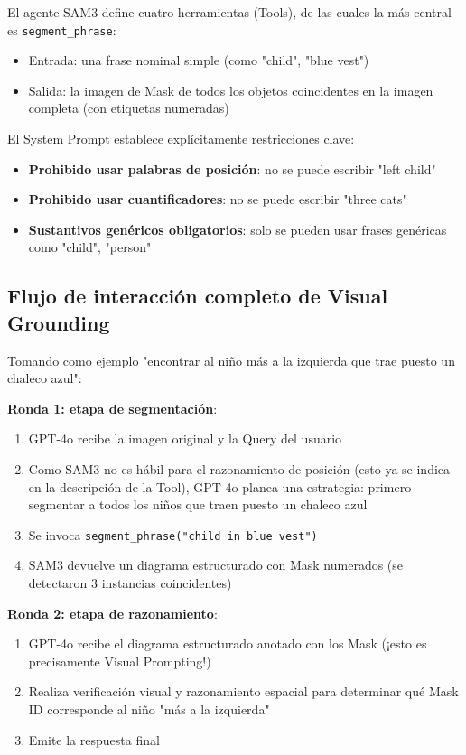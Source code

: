 \documentclass[a4paper]{article}
\begin{document}
El agente SAM3 define cuatro herramientas (Tools), de las cuales la más central es \texttt{segment\_phrase}:

\begin{itemize}
    \item Entrada: una frase nominal simple (como "child", "blue vest")
    \item Salida: la imagen de Mask de todos los objetos coincidentes en la imagen completa (con etiquetas numeradas)
\end{itemize}

El System Prompt establece explícitamente restricciones clave:
\begin{itemize}
    \item \textbf{Prohibido usar palabras de posición}: no se puede escribir "left child"
    \item \textbf{Prohibido usar cuantificadores}: no se puede escribir "three cats"
    \item \textbf{Sustantivos genéricos obligatorios}: solo se pueden usar frases genéricas como "child", "person"
\end{itemize}

\subsection{Flujo de interacción completo de Visual Grounding}

Tomando como ejemplo "encontrar al niño más a la izquierda que trae puesto un chaleco azul":

\textbf{Ronda 1: etapa de segmentación}:
\begin{enumerate}
    \item GPT-4o recibe la imagen original y la Query del usuario
    \item Como SAM3 no es hábil para el razonamiento de posición (esto ya se indica en la descripción de la Tool), GPT-4o planea una estrategia: primero segmentar a todos los niños que traen puesto un chaleco azul
    \item Se invoca \texttt{segment\_phrase("child in blue vest")}
    \item SAM3 devuelve un diagrama estructurado con Mask numerados (se detectaron 3 instancias coincidentes)
\end{enumerate}

\textbf{Ronda 2: etapa de razonamiento}:
\begin{enumerate}
    \item GPT-4o recibe el diagrama estructurado anotado con los Mask (¡esto es precisamente Visual Prompting!)
    \item Realiza verificación visual y razonamiento espacial para determinar qué Mask ID corresponde al niño "más a la izquierda"
    \item Emite la respuesta final
\end{enumerate}
\end{document}
